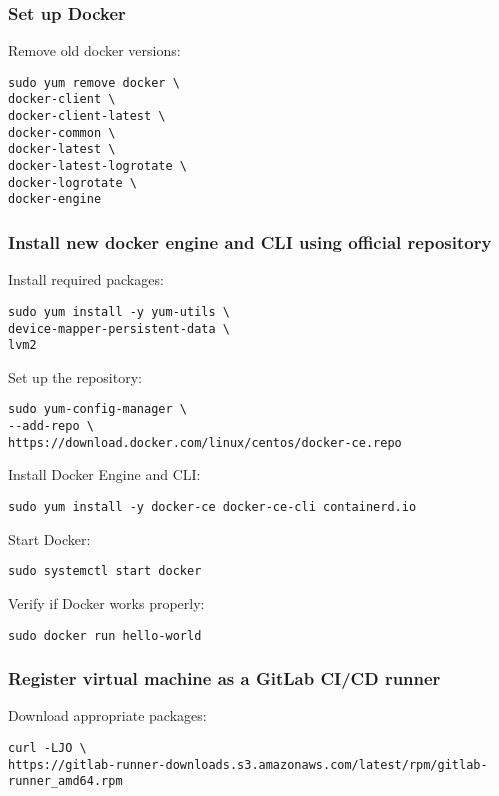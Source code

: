 \subsubsection*{Set up Docker}

\noindent
Remove old docker versions:
\begin{lstlisting}
sudo yum remove docker \
docker-client \
docker-client-latest \
docker-common \
docker-latest \
docker-latest-logrotate \
docker-logrotate \
docker-engine
\end{lstlisting}

\clearpage
\subsubsection*{Install new docker engine and CLI using official repository}

\noindent
Install required packages:
\begin{lstlisting}
sudo yum install -y yum-utils \
device-mapper-persistent-data \
lvm2
\end{lstlisting}

\noindent
Set up the repository:
\begin{lstlisting}
sudo yum-config-manager \
--add-repo \
https://download.docker.com/linux/centos/docker-ce.repo
\end{lstlisting}

\noindent
Install Docker Engine and CLI:
\begin{lstlisting}
sudo yum install -y docker-ce docker-ce-cli containerd.io
\end{lstlisting}

\noindent
Start Docker:
\begin{lstlisting}
sudo systemctl start docker
\end{lstlisting}

\noindent
Verify if Docker works properly:
\begin{lstlisting}
sudo docker run hello-world
\end{lstlisting}

\subsubsection*{Register virtual machine as a GitLab CI/CD runner}

\noindent
Download appropriate packages:
\begin{lstlisting}
curl -LJO \
https://gitlab-runner-downloads.s3.amazonaws.com/latest/rpm/gitlab-runner_amd64.rpm
\end{lstlisting}

